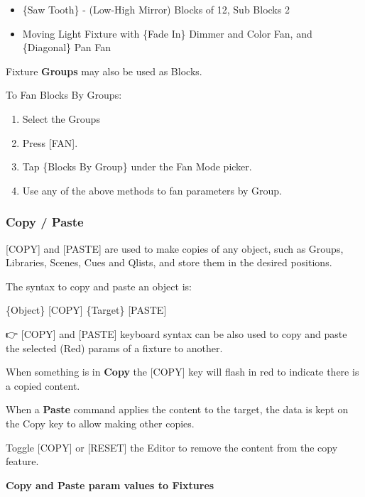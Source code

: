 \documentclass[
]{article}
\providecommand{\tightlist}{%
  \setlength{\itemsep}{0pt}\setlength{\parskip}{0pt}}
\begin{document}
\begin{itemize}
\tightlist
\item
  \{Saw Tooth\} - (Low-High Mirror) Blocks of 12, Sub Blocks 2
\end{itemize}

\begin{itemize}
\tightlist
\item
  Moving Light Fixture with \{Fade In\} Dimmer and Color Fan, and \{Diagonal\} Pan Fan
\end{itemize}

Fixture \textbf{Groups} may also be used as Blocks.

To Fan Blocks By Groups:

\begin{enumerate}
\def\labelenumi{\arabic{enumi}.}
\item
  Select the Groups
\item
  Press {[}FAN{]}.
\item
  Tap \{Blocks By Group\} under the Fan Mode picker.
\item
  Use any of the above methods to fan parameters by Group.
\end{enumerate}

\hypertarget{copy-paste}{%
\subsubsection{Copy / Paste}\label{copy-paste}}

{[}COPY{]} and {[}PASTE{]} are used to make copies of any object, such as Groups, Libraries, Scenes, Cues and Qlists, and store them in the desired positions.

The syntax to copy and paste an object is:

\{Object\} {[}COPY{]} \{Target\} {[}PASTE{]}

👉 {[}COPY{]} and {[}PASTE{]} keyboard syntax can be also used to copy and paste the selected (Red) params of a fixture to another.

When something is in \textbf{Copy} the {[}COPY{]} key will flash in {red} to indicate there is a copied content.

When a \textbf{Paste} command applies the content to the target, the data is kept on the Copy key to allow making other copies.

Toggle {[}COPY{]} or {[}RESET{]} the Editor to remove the content from the copy feature.

\textbf{Copy and Paste param values to Fixtures}
\end{document}
